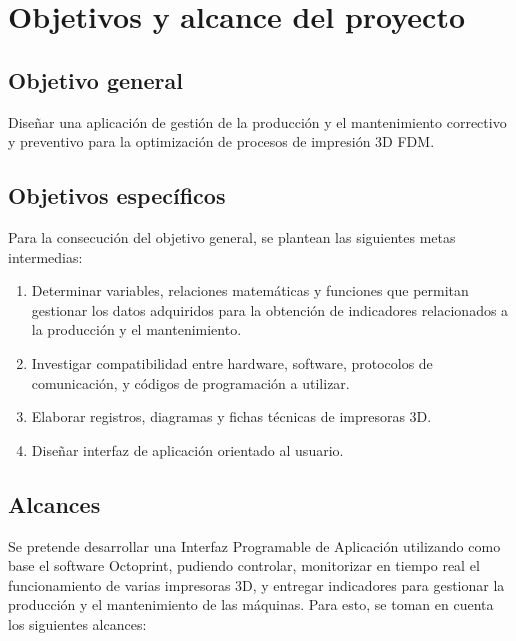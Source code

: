 \section{Objetivos y alcance del proyecto}
\label{intro:objetivos}

\subsection{Objetivo general}

Diseñar una aplicación de gestión de la producción y el mantenimiento correctivo y preventivo para la optimización de procesos de impresión 3D FDM.

\subsection{Objetivos espec\'ificos}

Para la consecución del objetivo general, se plantean las siguientes metas intermedias:

\begin{enumerate}
 	\item Determinar variables, relaciones matemáticas y funciones que permitan gestionar los datos adquiridos para la obtención de indicadores relacionados a la producción y el mantenimiento. 
	\item Investigar compatibilidad entre hardware, software, protocolos de comunicación, y códigos de programación a utilizar.
	\item Elaborar registros, diagramas y fichas técnicas de impresoras 3D.
	\item Diseñar interfaz de aplicación orientado al usuario. 
	
\end{enumerate} 
\clearpage
\subsection{Alcances}

Se pretende desarrollar una Interfaz Programable de Aplicación utilizando como base el software Octoprint, pudiendo controlar, monitorizar en tiempo real el funcionamiento de varias impresoras 3D, y entregar indicadores para gestionar la producción y el mantenimiento de las máquinas. Para esto, se toman en cuenta los siguientes alcances:

